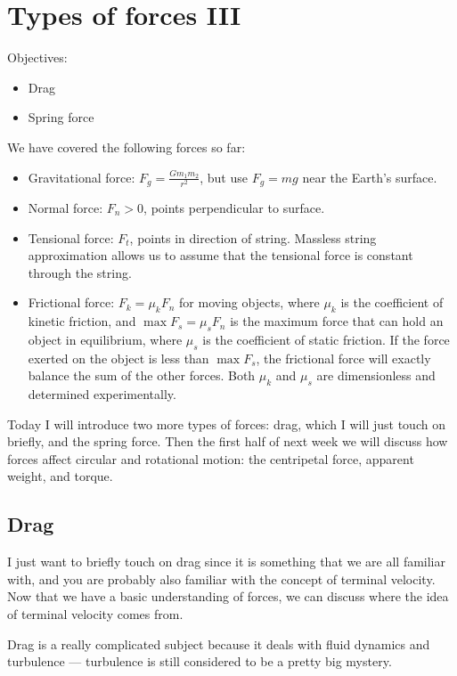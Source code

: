 \section{Types of forces III}
Objectives:
\begin{itemize}
\item Drag
\item Spring force
\end{itemize}

We have covered the following forces so far:
\begin{itemize}
\item Gravitational force: $F_g=\frac{Gm_1m_2}{r^2}$, but use $F_g=mg$ near the Earth's surface.
\item Normal force: $F_n>0$, points perpendicular to surface.
\item Tensional force: $F_t$, points in direction of string. Massless string approximation allows us to assume that the tensional force is constant through the string.
\item Frictional force: $F_k=\mu_kF_n$ for moving objects, where $\mu_k$ is the coefficient of kinetic friction, and $\max F_s=\mu_sF_n$ is the maximum force that can hold an object in equilibrium, where $\mu_s$ is the coefficient of static friction. If the force exerted on the object is less than $\max F_s$, the frictional force will exactly balance the sum of the other forces. Both $\mu_k$ and $\mu_s$ are dimensionless and determined experimentally.
\end{itemize}

Today I will introduce two more types of forces: drag, which I will just touch on briefly, and the spring force. Then the first half of next week we will discuss how forces affect circular and rotational motion: the centripetal force, apparent weight, and torque. %

\subsection{Drag}
I just want to briefly touch on drag since it is something that we are all familiar with, and you are probably also familiar with the concept of terminal velocity. Now that we have a basic understanding of forces, we can discuss where the idea of terminal velocity comes from.

Drag is a really complicated subject because it deals with fluid dynamics and turbulence --- turbulence is still considered to be a pretty big mystery.

